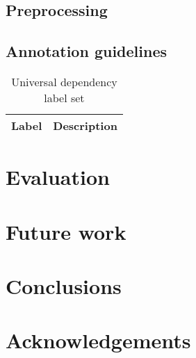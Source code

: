 \documentclass[a4paper,11pt, onecolumn]{article}
\begin{document}
\subsection{Preprocessing}

\cite{Washington14}

\subsection{Annotation guidelines}

\begin{table}
  \centering
  \begin{tabular}{|l|l|}
    \hline
    \textbf{Label} & \textbf{Description} \\

    \hline
  \end{tabular}
  \caption{Universal dependency label set}
\end{table}

\section{Evaluation}

\section{Future work}


\section{Conclusions}

\section*{Acknowledgements}



\end{document}
